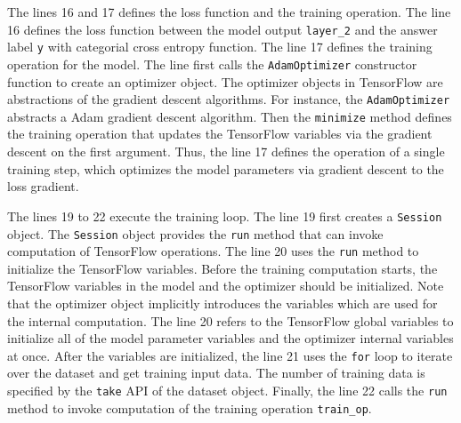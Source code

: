 The lines 16 and 17 defines the loss function and the training operation. 
The line 16 defines the loss function between the model output {\tt layer\_2} 
and the answer label {\tt y} with categorial cross entropy function.
The line 17 defines the training operation for the model.
The line first calls the {\tt AdamOptimizer} constructor
function to create an optimizer object.
The optimizer objects in TensorFlow are abstractions of the gradient
descent algorithms.
For instance, the {\tt AdamOptimizer} abstracts a Adam gradient descent
algorithm. %
Then the {\tt minimize} method defines the training operation that updates the
TensorFlow variables via the gradient descent on the first argument.
Thus, the line 17 defines the operation of a single training step,
which optimizes the model parameters via gradient descent to the loss gradient.

The lines 19 to 22 execute the training loop. 
The line 19 first creates a {\tt Session} object.
The {\tt Session} object provides the {\tt run} method that can invoke
computation of TensorFlow operations.
The line 20 uses the {\tt run} method to initialize the TensorFlow variables.
Before the training computation starts,
the TensorFlow variables in the model and the optimizer should be initialized.
Note that the optimizer object implicitly introduces the variables which are 
used for the internal computation.
The line 20 refers to the TensorFlow global variables to initialize
all of the model parameter variables and the optimizer internal variables
at once.
After the variables are initialized, the line 21 uses the {\tt for} loop
to iterate over the dataset and get training input data. 
The number of training data is specified by the {\tt take} API of the
dataset object.
Finally, the line 22 calls the {\tt run} method to
invoke computation of the training operation {\tt train\_op}.
